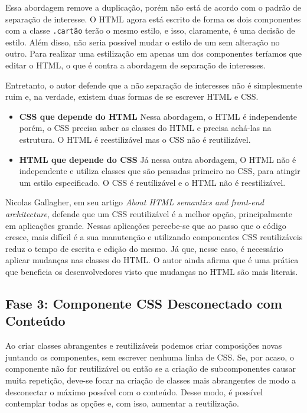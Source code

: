 Essa abordagem remove a duplicação, porém não está de acordo com o
padrão de separação de interesse. O HTML agora está escrito de forma os
dois componentes com a classe \texttt{.cartão} terão o mesmo estilo, e
isso, claramente, é uma decisão de estilo. Além disso, não seria
possível mudar o estilo de um sem alteração no outro. Para realizar uma
estilização em apenas um dos componentes teríamos que editar o HTML, o
que é contra a abordagem de separação de interesses.

Entretanto, o autor defende que a não separação de interesses não é
simplesmente ruim e, na verdade, existem duas formas de se escrever HTML
e CSS.

\begin{itemize}
\tightlist
\item
  \textbf{CSS que depende do HTML} Nessa abordagem, o HTML é
  independente porém, o CSS precisa saber as classes do HTML e precisa
  achá-las na estrutura. O HTML é reestilizável mas o CSS não é
  reutilizável.
\item
  \textbf{HTML que depende do CSS} Já nessa outra abordagem, O HTML não
  é independente e utiliza classes que são pensadas primeiro no CSS,
  para atingir um estilo especificado. O CSS é reutílizável e o HTML não
  é reestilizável.
\end{itemize}

Nicolas Gallagher, em seu artigo \emph{About HTML semantics and
front-end architecture}, defende que um CSS reutilizável é a melhor
opção, principalmente em aplicações grande. Nessas aplicações percebe-se
que ao passo que o código cresce, mais difícil é a sua manutenção e
utilizando componentes CSS reutilizáveis reduz o tempo de escrita e
edição do mesmo. Já que, nesse caso, é necessário aplicar mudanças nas
classes do HTML. O autor ainda afirma que é uma prática que beneficia os
desenvolvedores visto que mudanças no HTML são mais literais.

\hypertarget{fase-3-componente-css-desconectado-com-conteuxfado}{%
\subsection{Fase 3: Componente CSS Desconectado com
Conteúdo}\label{fase-3-componente-css-desconectado-com-conteuxfado}}

Ao criar classes abrangentes e reutilizáveis podemos criar composições
novas juntando os componentes, sem escrever nenhuma linha de CSS. Se,
por acaso, o componente não for reutilizável ou então se a criação de
subcomponentes causar muita repetição, deve-se focar na criação de
classes mais abrangentes de modo a desconectar o máximo possível com o
conteúdo. Desse modo, é possível contemplar todas as opções e, com isso,
aumentar a reutilização.


